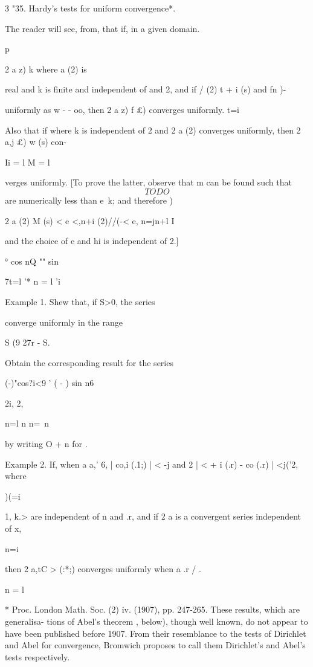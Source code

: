 3 "35. Hardy's tests for uniform convergence*.

The reader will see, from, that if, in a given domain.

p

2 a z) k where a (2) is

real and k is finite and independent of and 2, and if / (2) t + i (s)
and fn )-

uniformly as w - - oo, then 2 a z) f £) converges uniformly. t=i

Also that if where k is independent of 2 and 2 a (2) converges
uniformly, then 2 a,j £) w (s) con-

Ii = l M = l

verges uniformly. [To prove the latter, observe that m can be found
such that
$$
TODO
$$
are numerically less than e\ k; and therefore )

2 a (2) M (s) < e <,n+i (2)//(-< e, n=jn+l I

and the choice of e and hi is independent of 2.]

° cos nQ "" sin %

7t=l '* n = l 'i

Example 1. Shew that, if S>0, the series

converge uniformly in the range

S (9 27r - S.

Obtain the corresponding result for the series

  (-)"cos?i<9 ' ( - ) sin n6

2i, 2,

n=l n n=\ n

by writing O + n for .

Example 2. If, when a a,' 6, | co,i (.1;) | < -j and 2 | < + i (.r) -
co (.r) | <j('2, where

)(=i

 1, k.> are independent of n and .r, and if 2 a is a convergent
series independent of x,

n=i

then 2 a,tC > (:*;) converges uniformly when a .r / . 

n = l

* Proc. London Math. Soc. (2) iv. (1907), pp. 247-265. These results,
which are generalisa- tions of Abel's theorem , below), though
well known, do not appear to have been published before 1907. From
their resemblance to the tests of Dirichlet and Abel for convergence,
Bromwich proposes to call them Dirichlet's and Abel's tests
respectively.

